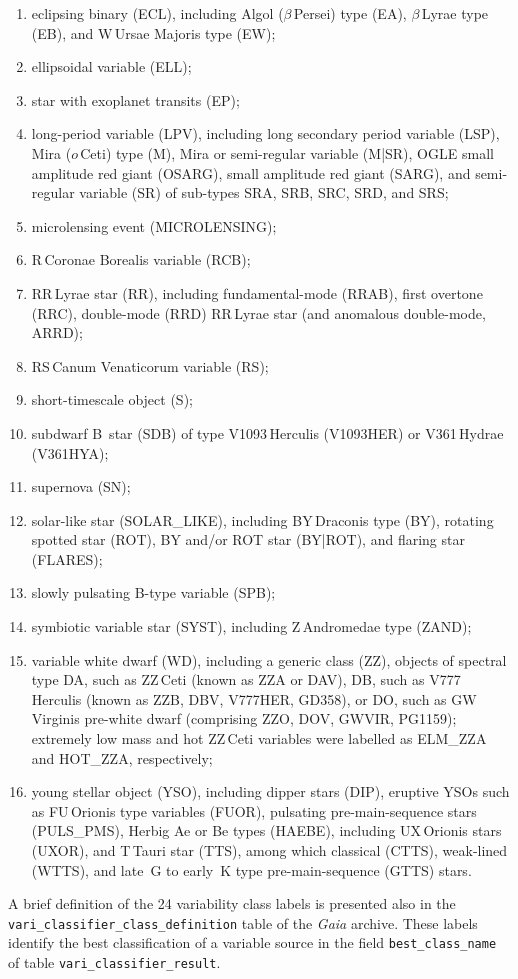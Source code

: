 \documentclass[longauth]{aa}
\def\gaia{\textit{Gaia}\xspace}
\begin{document}
\begin{enumerate}
  \item eclipsing binary (ECL), including Algol ($\beta$\,Persei) type (EA), $\beta$\,Lyrae type (EB), and W\,Ursae Majoris type (EW); 
  \item ellipsoidal variable (ELL); 
  \item star with exoplanet transits (EP); 
  \item long-period variable (LPV), including long secondary period variable (LSP), Mira ($o$\,Ceti) type (M), Mira or semi-regular variable (M|SR), OGLE small amplitude red giant (OSARG), small amplitude red giant (SARG), and semi-regular variable (SR) of sub-types SRA, SRB, SRC, SRD, and SRS; 
  \item microlensing event (MICROLENSING); 
  \item R\,Coronae Borealis variable (RCB); 
  \item RR\,Lyrae star (RR), including fundamental-mode (RRAB), first overtone (RRC), double-mode (RRD) RR\,Lyrae star (and anomalous double-mode, ARRD);
  \item RS\,Canum Venaticorum variable (RS); 
  \item short-timescale object (S); 
  \item subdwarf B~star (SDB) of type V1093\,Herculis (V1093HER) or V361\,Hydrae (V361HYA);
  \item supernova (SN); 
  \item solar-like star (SOLAR\_LIKE), including BY\,Draconis type (BY), rotating spotted star (ROT), BY and/or ROT star (BY|ROT), and flaring star (FLARES); 
  \item slowly pulsating B-type variable (SPB); 
  \item symbiotic variable star (SYST), including Z\,Andromedae type (ZAND); 
  \item variable white dwarf (WD), including a generic class (ZZ), objects of spectral type DA, such as ZZ\,Ceti (known as ZZA or DAV), DB, such as V777\,Herculis (known as ZZB, DBV, V777HER, GD358), or DO, such as GW\,Virginis pre-white dwarf (comprising ZZO, DOV, GWVIR, PG1159); extremely low mass and hot ZZ\,Ceti variables were labelled as ELM\_ZZA and HOT\_ZZA, respectively; 
  \item young stellar object (YSO), including dipper stars (DIP), eruptive YSOs such as FU\,Orionis type variables (FUOR), pulsating pre-main-sequence stars (PULS\_PMS), Herbig Ae or Be types (HAEBE), including UX\,Orionis stars (UXOR), and T\,Tauri star (TTS), among which classical (CTTS), weak-lined (WTTS), and late~G to early~K type pre-main-sequence (GTTS) stars. \label{itm:yso} 
\end{enumerate}
A brief definition of the 24 variability class labels is presented also in the  \texttt{vari\_classifier\_class\_definition} table of the \gaia archive.
These labels identify the best classification of a variable source in the field \texttt{best\_class\_name} of table \texttt{vari\_classifier\_result}.
\end{document}

